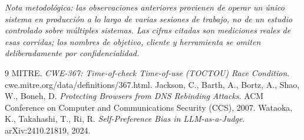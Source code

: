 \documentclass[10pt]{article}
\begin{document}
\vspace{0.6em}
{\small\itshape Nota metodológica: las observaciones anteriores provienen de operar un único sistema en producción a lo largo de varias sesiones de trabajo, no de un estudio controlado sobre múltiples sistemas. Las cifras citadas son mediciones reales de esas corridas; los nombres de objetivo, cliente y herramienta se omiten deliberadamente por confidencialidad.}

\begin{thebibliography}{9}
 MITRE. \emph{CWE-367: Time-of-check Time-of-use (TOCTOU) Race Condition}. cwe.mitre.org/data/definitions/367.html.
 Jackson, C., Barth, A., Bortz, A., Shao, W., Boneh, D. \emph{Protecting Browsers from DNS Rebinding Attacks}. ACM Conference on Computer and Communications Security (CCS), 2007.
 Wataoka, K., Takahashi, T., Ri, R. \emph{Self-Preference Bias in LLM-as-a-Judge}. arXiv:2410.21819, 2024.
\end{thebibliography}
\end{document}
